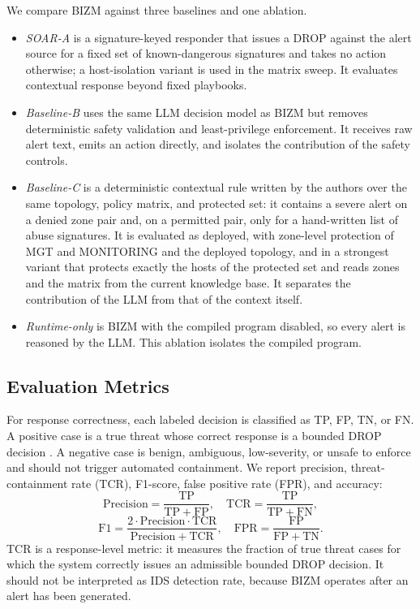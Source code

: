 \documentclass[final,5p]{elsarticle}
\begin{document}
We compare BIZM against three baselines and one ablation.
\begin{itemize}
    \item \emph{SOAR-A} is a signature-keyed responder that issues a DROP against the alert source for a fixed set of known-dangerous signatures and takes no action otherwise; a host-isolation variant is used in the matrix sweep. It evaluates contextual response beyond fixed playbooks.
    \item \emph{Baseline-B} uses the same LLM decision model as BIZM but removes deterministic safety validation and least-privilege enforcement. It receives raw alert text, emits an action directly, and isolates the contribution of the safety controls.
    \item \emph{Baseline-C} is a deterministic contextual rule written by the authors over the same topology, policy matrix, and protected set: it contains a severe alert on a denied zone pair and, on a permitted pair, only for a hand-written list of abuse signatures. It is evaluated as deployed, with zone-level protection of MGT and MONITORING and the deployed topology, and in a strongest variant that protects exactly the hosts of the protected set and reads zones and the matrix from the current knowledge base. It separates the contribution of the LLM from that of the context itself.
    \item \emph{Runtime-only} is BIZM with the compiled program disabled, so every alert is reasoned by the LLM. This ablation isolates the compiled program.
\end{itemize}

\subsection{Evaluation Metrics}
\label{sec:evaluation_metrics}

For response correctness, each labeled decision is classified as TP, FP, TN, or FN. A positive case is a true threat whose correct response is a bounded DROP decision \cite{jSAID23}. A negative case is benign, ambiguous, low-severity, or unsafe to enforce and should not trigger automated containment. We report precision, threat-containment rate (TCR), F1-score, false positive rate (FPR), and accuracy:
\[
\mathrm{Precision}=\frac{\mathrm{TP}}{\mathrm{TP}+\mathrm{FP}},
\quad
\mathrm{TCR}=\frac{\mathrm{TP}}{\mathrm{TP}+\mathrm{FN}},
\]
\[
\mathrm{F1}=\frac{2\cdot \mathrm{Precision}\cdot \mathrm{TCR}}
{\mathrm{Precision}+\mathrm{TCR}},
\quad
\mathrm{FPR}=\frac{\mathrm{FP}}{\mathrm{FP}+\mathrm{TN}}.
\]
TCR is a response-level metric: it measures the fraction of true threat cases for which the system correctly issues an admissible bounded DROP decision. It should not be interpreted as IDS detection rate, because BIZM operates after an alert has been generated.
\end{document}
